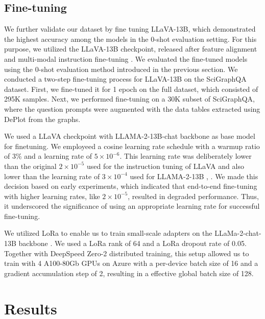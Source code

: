 \documentclass{article}
\begin{document}
\subsection{Fine-tuning}\label{finetuningmethod}
We further validate our dataset by fine tuning LLaVA-13B, which demonstrated the highest accuracy among the models in the 0-shot evaluation setting. For this purpose, we utilized the LLaVA-13B checkpoint, released after feature alignment and multi-modal instruction fine-tuning \cite{liu2023}. We evaluated the fine-tuned models using the 0-shot evaluation method introduced in the previous section.
We conducted a two-step fine-tuning process for LLaVA-13B on the SciGraphQA dataset. First, we fine-tuned it for 1 epoch on the full dataset, which consisted of 295K samples. Next, we performed fine-tuning on a 30K subset of SciGraphQA, where the question prompts were augmented with the data tables extracted using DePlot from the graphs.

We used a LLaVA checkpoint with LLAMA-2-13B-chat backbone as base model for finetuning. We employeed a cosine learning rate schedule with a warmup ratio of 3\% and a learning rate of \(5 \times 10^{-6}\). This learning rate was deliberately lower than the original \(2 \times 10^{-5}\) used for the instruction tuning of LLaVA and also lower than the learning rate of \(3 \times 10^{-4}\) used for LLAMA-2-13B \cite{liu2023}, \cite{touvron2023}. We made this decision based on early experiments, which indicated that end-to-end fine-tuning with higher learning rates, like \(2 \times 10^{-5}\), resulted in degraded performance. Thus, it underscored the significance of using an appropriate learning rate for successful fine-tuning.

We utilized LoRa to enable us to train small-scale adapters on the LLaMa-2-chat-13B backbone \cite{touvron2023}. We used a LoRa rank of 64 and a LoRa dropout rate of 0.05. Together with DeepSpeed Zero-2 distributed training, this setup allowed us to train with 4 A100-80Gb GPUs on Azure with a per-device batch size of 16 and a gradient accumulation step of 2, resulting in a effective global batch size of 128. 

\section{Results}
\end{document}
